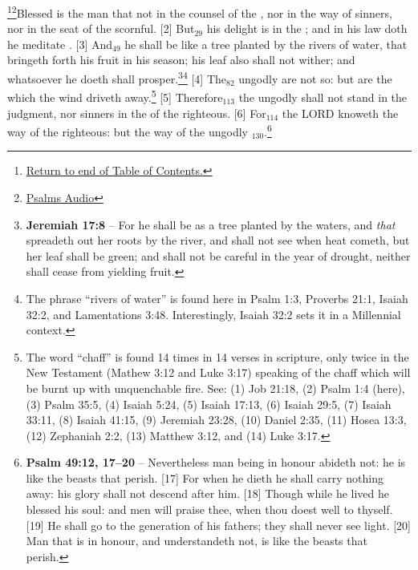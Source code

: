 \footnote{\textcolor[cmyk]{0.99998,1,0,0}{\hyperlink{TOC}{Return to end of Table of Contents.}}}\footnote{\href{https://www.audioverse.org/english/audiobibles/books/ENGKJV/O/Ps/1}{\textcolor[cmyk]{0.99998,1,0,0}{Psalms Audio}}}\textcolor[cmyk]{0.99998,1,0,0}{Blessed is the man that  not in the counsel of the , nor  in the way of sinners, nor  in the seat of the scornful.}
[2] \textcolor[cmyk]{0.99998,1,0,0}{But\textcolor{jungle}{$_{29}$} his delight is in the ; and in his law doth he meditate .}
[3] \textcolor[cmyk]{0.99998,1,0,0}{And\textcolor{jungle}{$_{49}$} he shall be like a tree planted by the rivers of water, that bringeth forth his fruit in his season; his leaf also shall not wither; and whatsoever he doeth shall prosper.}\footnote{\textbf{Jeremiah 17:8} -- For he shall be as a tree planted by the waters, and \emph{that} spreadeth out her roots by the river, and shall not see when heat cometh, but her leaf shall be green; and shall not be careful in the year of drought, neither shall cease from yielding fruit.}\footnote{The phrase ``rivers of water'' is found here in Psalm 1:3, Proverbs 21:1, Isaiah 32:2, and Lamentations 3:48. Interestingly, Isaiah 32:2 sets it in a Millennial context.}
[4] \textcolor[cmyk]{0.99998,1,0,0}{The\textcolor{jungle}{$_{82}$} ungodly are not so: but are  the  which the wind driveth away.}\footnote{The word ``chaff'' is found 14 times in 14 verses in scripture, only twice in the New Testament (Mathew 3:12 and Luke 3:17) speaking of the chaff which will be burnt up with unquenchable fire. See: (1) Job 21:18, (2)  Psalm 1:4 (here),  (3) Psalm 35:5, (4)  Isaiah 5:24, (5)  Isaiah 17:13, (6)  Isaiah 29:5, (7) Isaiah 33:11, (8)  Isaiah 41:15, (9) Jeremiah 23:28, (10) Daniel 2:35, (11) Hosea 13:3, (12) Zephaniah 2:2, (13) Matthew 3:12, and (14) Luke 3:17.} 
[5] \textcolor[cmyk]{0.99998,1,0,0}{Therefore\textcolor{jungle}{$_{113}$} the ungodly shall not stand in the judgment, nor sinners in the  of the righteous.}
[6] \textcolor[cmyk]{0.99998,1,0,0}{For\textcolor{jungle}{$_{114}$} the LORD knoweth the way of the righteous: but the way of the ungodly \textcolor{jungle}{$_{130}$}.}\footnote{\textbf{Psalm 49:12, 17--20} -- Nevertheless man being in honour abideth not: he is like the beasts that perish. [17]  For when he dieth he shall carry nothing away: his glory shall not descend after him.  [18]  Though while he lived he blessed his soul: and men will praise thee, when thou doest well to thyself. [19]  He shall go to the generation of his fathers; they shall never see light.  [20]  Man that is in honour, and understandeth not, is like the beasts that perish.}

